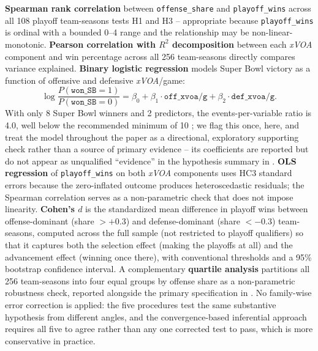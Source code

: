 \documentclass[12pt,a4paper]{article}
\newcommand{\xvoa}{\textit{xVOA}}
\begin{document}
\textbf{Spearman rank correlation} between \texttt{offense\_share} and \texttt{playoff\_wins} across all 108 playoff team-seasons tests H1 and H3 -- appropriate because \texttt{playoff\_wins} is ordinal with a bounded 0--4 range and the relationship may be non-linear-monotonic. \textbf{Pearson correlation with $R^2$ decomposition} between each \xvoa{} component and win percentage across all 256 team-seasons directly compares variance explained. \textbf{Binary logistic regression} models Super Bowl victory as a function of offensive and defensive \xvoa{}/game:
\begin{equation}
  \label{eq:logistic}
  \log \frac{P(\texttt{won\_SB} = 1)}{P(\texttt{won\_SB} = 0)}
  = \beta_0 + \beta_1 \cdot \texttt{off\_xvoa/g} + \beta_2 \cdot \texttt{def\_xvoa/g}.
\end{equation}
With only 8 Super Bowl winners and 2 predictors, the events-per-variable ratio is 4.0, well below the recommended minimum of 10 \citep{hosmer2013logistic, peduzzi1996simulation}; we flag this once, here, and treat the model throughout the paper as a directional, exploratory supporting check rather than a source of primary evidence -- its coefficients are reported but do not appear as unqualified ``evidence'' in the hypothesis summary in . \textbf{OLS regression} of \texttt{playoff\_wins} on both \xvoa{} components uses HC3 standard errors because the zero-inflated outcome produces heteroscedastic residuals; the Spearman correlation serves as a non-parametric check that does not impose linearity. \textbf{Cohen's $d$} is the standardized mean difference in playoff wins between offense-dominant (share $> +0.3$) and defense-dominant (share $< -0.3$) team-seasons, computed across the full sample (not restricted to playoff qualifiers) so that it captures both the selection effect (making the playoffs at all) and the advancement effect (winning once there), with conventional thresholds \citep{cohen1988statisticalpower} and a 95\% bootstrap confidence interval. A complementary \textbf{quartile analysis} partitions all 256 team-seasons into four equal groups by offense share as a non-parametric robustness check, reported alongside the primary specification in . No family-wise error correction is applied: the five procedures test the same substantive hypothesis from different angles, and the convergence-based inferential approach requires all five to agree rather than any one corrected test to pass, which is more conservative in practice.
\end{document}

